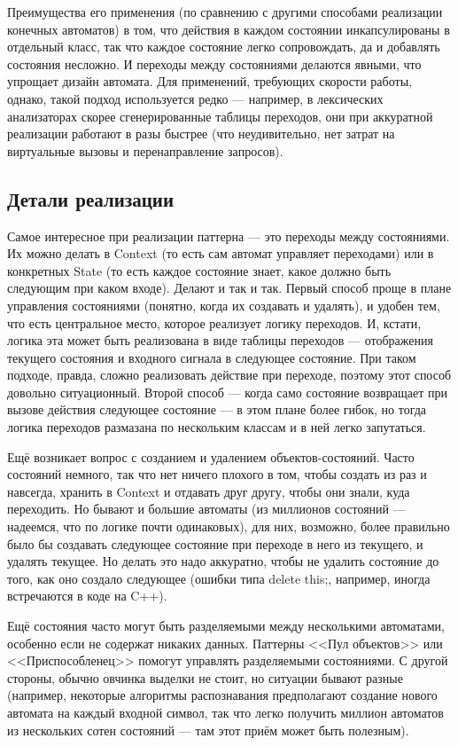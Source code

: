 \documentclass{../../text-style}
\begin{document}
Преимущества его применения (по сравнению с другими способами реализации конечных автоматов) в том, что действия в каждом состоянии инкапсулированы в отдельный класс, так что каждое состояние легко сопровождать, да и добавлять состояния несложно. И переходы между состояниями делаются явными, что упрощает дизайн автомата. Для применений, требующих скорости работы, однако, такой подход используется редко --- например, в лексических анализаторах скорее сгенерированные таблицы переходов, они при аккуратной реализации работают в разы быстрее (что неудивительно, нет затрат на виртуальные вызовы и перенаправление запросов).

\subsection{Детали реализации}

Самое интересное при реализации паттерна --- это переходы между состояниями. Их можно делать в Context (то есть сам автомат управляет переходами) или в конкретных State (то есть каждое состояние знает, какое должно быть следующим при каком входе). Делают и так и так. Первый способ проще в плане управления состояниями (понятно, когда их создавать и удалять), и удобен тем, что есть центральное место, которое реализует логику переходов. И, кстати, логика эта может быть реализована в виде таблицы переходов --- отображения текущего состояния и входного сигнала в следующее состояние. При таком подходе, правда, сложно реализовать действие при переходе, поэтому этот способ довольно ситуационный. Второй способ --- когда само состояние возвращает при вызове действия следующее состояние --- в этом плане более гибок, но тогда логика переходов размазана по нескольким классам и в ней легко запутаться.

Ещё возникает вопрос с созданием и удалением объектов-состояний. Часто состояний немного, так что нет ничего плохого в том, чтобы создать из раз и навсегда, хранить в Context и отдавать друг другу, чтобы они знали, куда переходить. Но бывают и большие автоматы (из миллионов состояний --- надеемся, что по логике почти одинаковых), для них, возможно, более правильно было бы создавать следующее состояние при переходе в него из текущего, и удалять текущее. Но делать это надо аккуратно, чтобы не удалить состояние до того, как оно создало следующее (ошибки типа delete this;, например, иногда встречаются в коде на C++).

Ещё состояния часто могут быть разделяемыми между несколькими автоматами, особенно если не содержат никаких данных. Паттерны <<Пул объектов>> или <<Приспособленец>> помогут управлять разделяемыми состояниями. С другой стороны, обычно овчинка выделки не стоит, но ситуации бывают разные (например, некоторые алгоритмы распознавания предполагают создание нового автомата на каждый входной символ, так что легко получить миллион автоматов из нескольких сотен состояний --- там этот приём может быть полезным).
\end{document}
